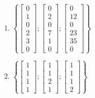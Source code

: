 \begin{enumerate}
\item
$\left\{\left[ \begin{array}{c} 0 \\ 1 \\ 0\\ 2 \\ 3 \\ 0 \end{array} \right] ;
\left[ \begin{array}{c} 0 \\ 2 \\ 0\\ 7 \\ 1 \\ 0 \end{array} \right] ;
\left[ \begin{array}{c} 0 \\ 12 \\ 0\\ 23 \\ 35 \\ 0 \end{array} \right] \right\}$


\item
$\left\{\left[ \begin{array}{c} 1 \\ 1 \\ 1 \\ 1 \end{array} \right] ; 
\left[ \begin{array}{c} 1 \\ 1 \\ 2 \\ 1 \end{array} \right] ;
\left[ \begin{array}{c} 1 \\ 1 \\ 1 \\ 2 \end{array} \right] \right\}
$
\end{enumerate}





\edXsolution{  }

\endedxproblem


\endedxvertical















\endedxvertical

